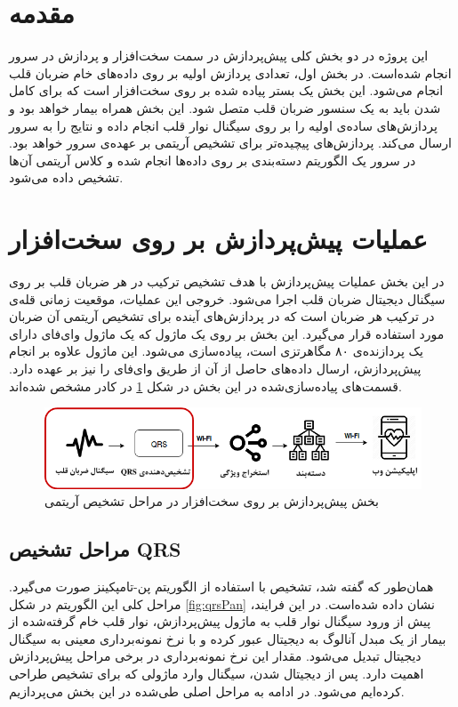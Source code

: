 
\pagebreak

\section{مقدمه}
 این پروژه در دو بخش کلی پیش‌پردازش در سمت سخت‌افزار و پردازش در سرور انجام شده‌است. در بخش اول، تعدادی پردازش اولیه بر روی داده‌های خام ضربان قلب انجام می‌شود. این بخش یک بستر پیاده شده بر روی سخت‌افزار است که برای کامل شدن باید به یک سنسور ضربان قلب متصل شود. این بخش همراه بیمار خواهد بود و پردازش‌های ساده‌ی اولیه را بر روی سیگنال نوار قلب انجام داده و نتایج را به سرور ارسال می‌کند.  پردازش‌های پیچیده‌تر برای تشخیص آریتمی بر عهده‌ی سرور خواهد بود. در سرور یک الگوریتم دسته‌بندی بر روی داده‌ها انجام شده و کلاس آریتمی آن‌ها تشخیص داده می‌شود.

\section{عملیات پیش‌پردازش بر روی سخت‌افزار} 
در این بخش عملیات پیش‌پردازش با هدف تشخیص ترکیب  در هر ضربان قلب بر روی سیگنال دیجیتال ضربان قلب اجرا می‌شود. خروجی این عملیات، موقعیت زمانی قله‌ی  در ترکیب  هر ضربان است که در پردازش‌های آینده برای تشخیص آریتمی آن ضربان مورد استفاده قرار می‌گیرد. این بخش بر روی یک ماژول  که یک ماژول وای‌فای دارای یک پردازنده‌ی ۸۰ مگاهرتزی است، پیاده‌سازی می‌شود. این ماژول علاوه بر انجام پیش‌پردازش، ارسال داده‌‌های حاصل از آن از طریق وای‌فای را نیز بر عهده دارد. قسمت‌های پیاده‌سازی‌شده در این بخش در شکل \ref{fig:preprocessing} در کادر مشخص شده‌اند.
\begin{figure}[!htb]
\centering
\includegraphics[width=16cm]{Figures/preprocessing.png}
\caption{بخش پیش‌پردازش بر روی سخت‌افزار در مراحل تشخیص آریتمی}
\label{fig:preprocessing}
\end{figure}

	\subsection{مراحل تشخیص QRS}

همان‌طور که گفته شد، تشخیص  با استفاده از الگوریتم پن-تامپکینز صورت می‌گیرد. مراحل کلی این الگوریتم در شکل \ref{fig:qrsPan} نشان داده شده‌است. در این فرایند، پیش از ورود سیگنال نوار قلب به ماژول پیش‌پردازش، نوار قلب خام گرفته‌شده از بیمار  از یک مبدل آنالوگ به دیجیتال عبور کرده و با نرخ نمونه‌برداری معینی به سیگنال دیجیتال تبدیل می‌شود. مقدار این نرخ نمونه‌برداری در برخی مراحل پیش‌پردازش اهمیت دارد. 
پس از دیجیتال شدن، سیگنال وارد ماژولی که برای تشخیص  طراحی کرده‌ایم می‌شود. در ادامه به مراحل اصلی طی‌شده در این بخش می‌پردازیم.

